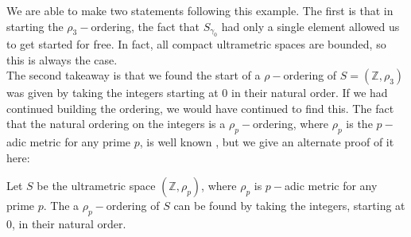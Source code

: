 We are able to make two statements following this example. The first is that in starting the $\rho_3-$ordering, the fact that $S_{\gamma_0}$ had only a single element allowed us to get started for free. In fact,  all compact ultrametric spaces are bounded, so this is always the case. \\

The second takeaway is that we found the start of a $\rho-$ordering of $S=(\mathbb{Z}, \rho_3)$ was given by taking the integers starting at $0$ in their natural order. If we had continued building the ordering, we would have continued to find this. The fact that the natural ordering on the integers is a $\rho_p-$ordering, where $\rho_p$ is the $p-$adic metric for any prime $p$, is well known \cite{mb1}, but we give an alternate proof of it here:\\ 

\begin{corollary} 
Let $S$ be the ultrametric space $(\mathbb{Z}, \rho_p)$, where $\rho_p$ is  $p-$adic metric for any prime $p$. The a $\rho_p-$ordering of $S$ can be found by taking the integers, starting at $0$, in their natural order.
\end{corollary}

